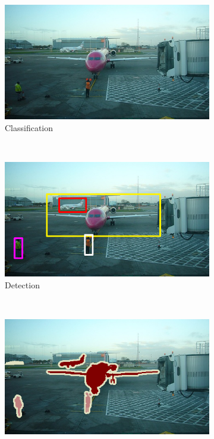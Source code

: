 \begin{figure}[hbt]
    \centering
    \begin{subfigure}[b]{0.3\textwidth}
        \centering
        \includegraphics[width=\textwidth]{000032}
        \caption{Classification}
        \label{fig:classification}
    \end{subfigure}%
    ~ %
    \begin{subfigure}[b]{0.3\textwidth}
            \centering
            \includegraphics[width=\textwidth]{000032-det}
            \caption{Detection}
            \label{fig:detection}
    \end{subfigure}
    ~ %
    \begin{subfigure}[b]{0.3\textwidth}
            \centering
            \includegraphics[width=\textwidth]{000032-clsseg}

\end{subfigure}
\end{figure}
